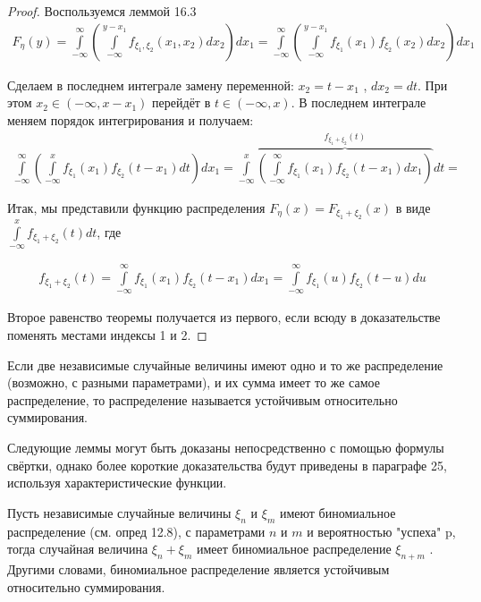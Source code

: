 \begin{proof}
Воспользуемся леммой 16.3
\begin{gather*}
	F_\eta (y) =
	\int\limits_{-\infty}^{\infty}\left(
		\int\limits_{-\infty}^{y-x_1 } f_{\xi_1,\xi_2} (x_1 , x_2 ) dx_2
	\right)dx_1=
	\int\limits_{-\infty}^{\infty}\left(
		\int\limits_{-\infty}^{y-x_1 } f_{\xi_1}(x_1)f_{\xi_2}(x_2) dx_2
	\right)dx_1
\end{gather*}

Сделаем в последнем интеграле замену переменной: $x_2 = t - x_1$ , $dx_2 = dt$.
При этом $x_2 \in (-\infty, x - x_1 )$ перейдёт в $t \in (-\infty, x)$. В последнем интеграле меняем порядок интегрирования и получаем:
\begin{gather*}
	\int\limits_{-\infty}^{\infty}\left(
		\int\limits_{-\infty}^{x} f_{\xi_1}(x_1)f_{\xi_2}(t-x_1) dt
	\right)dx_1=
	\int\limits_{-\infty}^{x}\overbrace{\left(
		\int\limits_{-\infty}^{\infty} f_{\xi_1}(x_1)f_{\xi_2}(t-x_1) dx_1
	\right)}^{f_{\xi_1+\xi_2}(t)}dt=
\end{gather*}

Итак, мы представили функцию распределения $F_\eta (x) = F_{\xi_1 +\xi_2} (x)$ в виде $\int\limits_{-\infty}^{x} f_{\xi_1 +\xi_2} (t) dt$, где

\begin{gather*}
	f_{\xi_1 +\xi_2} (t)=\int\limits_{-\infty}^{\infty} f_{\xi_1}(x_1)f_{\xi_2}(t-x_1) dx_1=\int\limits_{-\infty}^{\infty} f_{\xi_1}(u)f_{\xi_2}(t-u) du
\end{gather*}

Второе равенство теоремы получается из первого, если всюду в доказательстве поменять местами индексы 1 и 2.
\end{proof}

\begin{definition}
Если две независимые случайные величины имеют одно и то же распределение (возможно, с разными параметрами), и их сумма имеет то же самое распределение, то распределение называется устойчивым относительно суммирования.
\end{definition}

\begin{zam}
Следующие леммы могут быть доказаны непосредственно с помощью формулы свёртки, однако более короткие доказательства будут приведены в параграфе 25, используя характеристические функции.
\end{zam}

\begin{lemma}
	Пусть независимые случайные величины $\xi_n$ и $\xi_m$ имеют
биномиальное распределение (см. опред 12.8), с параметрами $n$ и $m$ и вероятностью "успеха" p, тогда случайная величина $\xi_n + \xi_m$ имеет биномиальное распределение $\xi_{n+m}$ . Другими словами, биномиальное распределение является устойчивым относительно суммирования.
\end{lemma}

